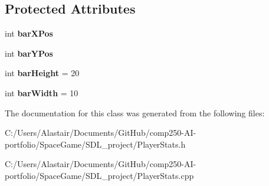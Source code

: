 \subsection*{Protected Attributes}
\begin{DoxyCompactItemize}
\item 
\mbox{\label{class_player_stats_a394ffdfa252f1b9e9b6b855dd5af1238}} 
int {\bfseries bar\+X\+Pos}
\item 
\mbox{\label{class_player_stats_a1d65749e6646e51ea8b398f33000d2ae}} 
int {\bfseries bar\+Y\+Pos}
\item 
\mbox{\label{class_player_stats_a0757964beff2e74c58cd4e073ab244e1}} 
int {\bfseries bar\+Height} = 20
\item 
\mbox{\label{class_player_stats_aa996108ad33b0d0dcfa690836970d014}} 
int {\bfseries bar\+Width} = 10
\end{DoxyCompactItemize}


The documentation for this class was generated from the following files\+:\begin{DoxyCompactItemize}
\item 
C\+:/\+Users/\+Alastair/\+Documents/\+Git\+Hub/comp250-\/\+A\+I-\/portfolio/\+Space\+Game/\+S\+D\+L\+\_\+project/Player\+Stats.\+h\item 
C\+:/\+Users/\+Alastair/\+Documents/\+Git\+Hub/comp250-\/\+A\+I-\/portfolio/\+Space\+Game/\+S\+D\+L\+\_\+project/Player\+Stats.\+cpp\end{DoxyCompactItemize}
